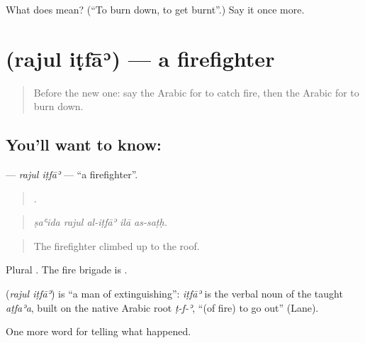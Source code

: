 \begin{tcolorbox}[breakable,colback=teal!4,colframe=teal!35!black,title={Before you move on}]
What does  mean? (\textquotedblleft{}To burn down, to get burnt\textquotedblright{}.) Say it once more.
\end{tcolorbox}
\section[\texorpdfstring{\ar{رجل} \ar{إطفاء} (rajul iṭfāʾ)}{رجل إطفاء (rajul iṭfāʾ)}]{  (rajul iṭfāʾ) — a firefighter}

\label{lesson:AR-C298-rajul-itfa}



\begin{quote}
Before the new one: say the Arabic for to catch fire, then the Arabic for to burn down.
\end{quote}

\subsection*{You'll want to know:  }
\textbf{ } — \emph{rajul iṭfāʾ} — \textquotedblleft{}a firefighter\textquotedblright{}.

\begin{quote}
    .
\end{quote}

\begin{quote}
\emph{ṣaʿida rajul al-iṭfāʾ ilā as-saṭḥ.}
\end{quote}

\begin{quote}
The firefighter climbed up to the roof.
\end{quote}

Plural  . The fire brigade is .

\begin{cousinweb}
\textbf{ } (\emph{rajul iṭfāʾ}) is \textquotedblleft{}a man of extinguishing\textquotedblright{}: \emph{iṭfāʾ} is the verbal noun of the taught \emph{aṭfaʾa}, built on the native Arabic root \emph{ṭ-f-ʾ}, \textquotedblleft{}(of fire) to go out\textquotedblright{} (Lane).
\end{cousinweb}

\begin{grammarlens}[title={What you've built}]
One more word for telling what happened.
\end{grammarlens}

